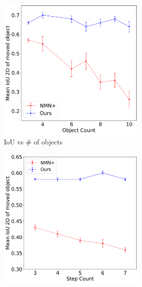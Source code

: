 \begin{figure}[h!]
\begin{subfigure}{0.5\hsize}
     \centering    \includegraphics[width=0.8\textwidth]{figures/multi-object-1.png}
    \caption{\footnotesize{IoU vs \# of objects}}
    \label{fig:large_scenes}
\end{subfigure}%
\begin{subfigure}{0.5\hsize}
     \centering    
     \includegraphics[width=0.8\textwidth]{figures/multi-step-1.png}

\end{subfigure}
\end{figure}
